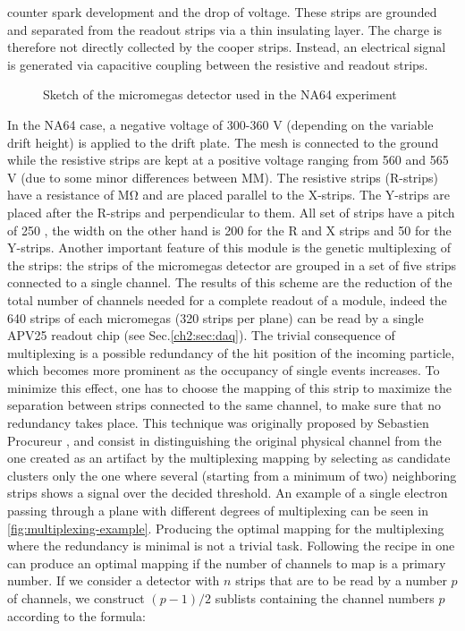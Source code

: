 counter spark development and the drop of voltage. These strips are grounded and separated from the readout strips via a thin insulating layer. The charge is therefore not directly collected by the cooper strips. Instead, an electrical signal is generated via capacitive coupling between the resistive and readout strips.

\begin{figure}[bth!]
\centering
\caption[Micromegas sketch]{Sketch of the micromegas detector used in the NA64 experiment}
\label{fig:mm-sketch}
\end{figure}

In the NA64 case, a negative voltage of 300-360 \si{\volt} (depending on the variable drift height) is applied to the drift plate. The mesh is connected to the ground while the resistive strips are kept at a positive voltage ranging from 560 and 565 \si{\volt} (due to some minor differences between MM). The resistive strips (R-strips) have a resistance of \si{\mega\ohm} and are placed parallel to the X-strips. The Y-strips are placed after the R-strips and perpendicular to them. All set of strips have a pitch of 250 \mum, the width on the other hand is 200 \mum for the R and X strips and 50 \mum for the Y-strips.
Another important feature of this module is the genetic multiplexing of the strips: the strips of the micromegas detector are grouped in a set of five strips connected to a single channel. The results of this scheme are the reduction of the total number of channels needed for a complete readout of a module, indeed the 640 strips of each micromegas (320 strips per plane) can be read by a single APV25 readout chip (see Sec.\ref{ch2:sec:daq}). The trivial consequence of multiplexing is a possible redundancy of the hit position of the incoming particle, which becomes more prominent as the occupancy of single events increases. To minimize this effect, one has to choose the mapping of this strip to maximize the separation between strips connected to the same channel, to make sure that no redundancy takes place. This technique was originally proposed by Sebastien Procureur \cite{Procureur:2013yea}, and consist in distinguishing the original physical channel from the one created as an artifact by the multiplexing mapping by selecting as candidate clusters only the one where several (starting from a minimum of two) neighboring strips shows a signal over the decided threshold. An example of a single electron passing through a plane with different degrees of multiplexing can be seen in \ref{fig:multiplexing-example}. Producing the optimal mapping for the multiplexing where the redundancy is minimal is not a trivial task. Following the recipe in \cite{Procureur:2013yea} one can produce an optimal mapping if the number of channels to map is a primary number. If we consider a detector with $n$ strips that are to be read by a number $p$ of channels, we construct $(p-1)/2$ sublists containing the channel numbers $p$ according to the formula:

